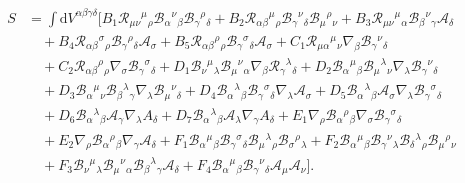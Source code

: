 \documentclass{article}
\begin{document}
\begin{equation}
    \label{PAG_4D_action}
    \begin{split}
    S
    & =
    \int  \mathrm{d}V^{\alpha \beta \gamma \delta} \bigg[
    B_1 \mathcal{R}_{\mu\nu}{}^{\mu}{}_{\rho}\mathcal{B}_{\alpha}{}^{\nu}{}_{\beta}\mathcal{B}_{\gamma}{}^{\rho}{}_{\delta}
    + B_2 \mathcal{R}_{\alpha\beta}{}^{\mu}{}_{\rho} \mathcal{B}_{\gamma}{}^{\nu}{}_{\delta} \mathcal{B}_{\mu}{}^{\rho}{}_{\nu}
    + B_3 \mathcal{R}_{\mu\nu}{}^{\mu}{}_{\alpha} \mathcal{B}_{\beta}{}^{\nu}{}_{\gamma} \mathcal{A}_\delta
    \\
    & \quad
    + B_4 \mathcal{R}_{\alpha\beta}{}^{\sigma}{}_{\rho}\mathcal{B}_{\gamma}{}^{\rho}{}_{\delta}\mathcal{A}_\sigma
    + B_5 \mathcal{R}_{\alpha \beta}{}^{\rho}{}_{\rho} \mathcal{B}_{\gamma}{}^{\sigma}{}_{\delta} \mathcal{A}_\sigma
    + C_1 \mathcal{R}_{\mu\alpha}{}^{\mu}{}_{\nu} \nabla_\beta \mathcal{B}_{\gamma}{}^{\nu}{}_{\delta}
    \\
    & \quad
    + C_2 \mathcal{R}_{\alpha\beta}{}^{\rho}{}_{\rho} \nabla_\sigma \mathcal{B}_{\gamma}{}^{\sigma}{}_{\delta}
    + D_1 \mathcal{B}_{\nu}{}^{\mu}{}_{\lambda} \mathcal{B}_{\mu}{}^{\nu}{}_{\alpha} \nabla_\beta \mathcal{R}_{\gamma}{}^{\lambda}{}_{\delta}
    + D_2 \mathcal{B}_{\alpha}{}^{\mu}{}_{\beta} \mathcal{B}_{\mu}{}^{\lambda}{}_{\nu} \nabla_{\lambda} \mathcal{B}_{\gamma}{}^{\nu}{}_{\delta}
    \\
    & \quad
    + D_3 \mathcal{B}_{\alpha}{}^{\mu}{}_{\nu}\mathcal{B}_{\beta}{}^{\lambda}{}_{\gamma} \nabla_\lambda \mathcal{B}_{\mu}{}^{\nu}{}_{\delta}
    + D_4 \mathcal{B}_{\alpha}{}^{\lambda}{}_{\beta}\mathcal{B}_{\gamma}{}^{\sigma}{}_{\delta}\nabla_\lambda \mathcal{A}_\sigma
    + D_5 \mathcal{B}_{\alpha}{}^{\lambda}{}_{\beta} \mathcal{A}_\sigma \nabla_\lambda \mathcal{B}_{\gamma}{}^{\sigma}{}_{\delta}
    \\
    &\quad
    + D_6 \mathcal{B}_{\alpha}{}^{\lambda}{}_{\beta}\mathcal{A}_\gamma \nabla_\lambda A_\delta
    + D_7\mathcal{B}_{\alpha}{}^{\lambda}{}_{\beta} \mathcal{A}_\lambda \nabla_\gamma A_\delta
    + E_1\nabla_\rho \mathcal{B}_{\alpha}{}^{\rho}{}_{\beta} \nabla_\sigma \mathcal{B}_{\gamma}{}^{\sigma}{}_{\delta}
    \\
    &\quad
    + E_2 \nabla_\rho \mathcal{B}_{\alpha}{}^{\rho}{}_{\beta} \nabla_\gamma \mathcal{A}_\delta
    + F_1 \mathcal{B}_{\alpha}{}^{\mu}{}_{\beta} \mathcal{B}_{\gamma}{}^{\sigma}{}_{\delta} \mathcal{B}_{\mu}{}^{\lambda}{}_{\rho} \mathcal{B}_{\sigma}{}^{\rho}{}_{\lambda}
    + F_2\mathcal{B}_{\alpha}{}^{\mu}{}_{\beta} \mathcal{B}_{\gamma}{}^{\nu}{}_{\lambda} \mathcal{B}_{\delta}{}^{\lambda}{}_{\rho} \mathcal{B}_{\mu}{}^{\rho}{}_{\nu}
    \\
    &\quad
    + F_3 \mathcal{B}_{\nu}{}^{\mu}{}_{\lambda} \mathcal{B}_{\mu}{}^{\nu}{}_{\alpha} \mathcal{B}_{\beta}{}^{\lambda}{}_{\gamma} \mathcal{A}_\delta
    + F_4 \mathcal{B}_{\alpha}{}^{\mu}{}_{\beta}\mathcal{B}_{\gamma}{}^{\nu}{}_{\delta}\mathcal{A}_\mu \mathcal{A}_\nu \bigg].
    \end{split}
\end{equation}
\end{document}
